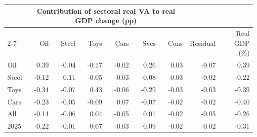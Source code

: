 \begin{tabular}{lrrrrrrrr}
\toprule
 & \multicolumn{6}{c}{Contribution of sectoral real VA to real GDP change (pp)} & & \\
\cmidrule(lr){2-7}
 & Oil & Steel & Toys & Cars & Svcs & Cons & Residual & Real GDP (\%) \\
\midrule
Oil & 0.39 & -0.04 & -0.17 & -0.02 & 0.26 & 0.03 & -0.07 & 0.39 \\
Steel & -0.12 & 0.11 & -0.05 & -0.03 & -0.08 & -0.03 & -0.02 & -0.22 \\
Toys & -0.34 & -0.07 & 0.43 & -0.06 & -0.29 & -0.03 & -0.03 & -0.39 \\
Cars & -0.23 & -0.05 & -0.09 & 0.07 & -0.07 & -0.02 & -0.02 & -0.40 \\
All & -0.14 & -0.06 & 0.04 & -0.05 & 0.01 & -0.02 & -0.05 & -0.26 \\
2025 & -0.22 & -0.01 & 0.07 & -0.03 & -0.09 & -0.02 & -0.02 & -0.31 \\
\bottomrule
\end{tabular}
